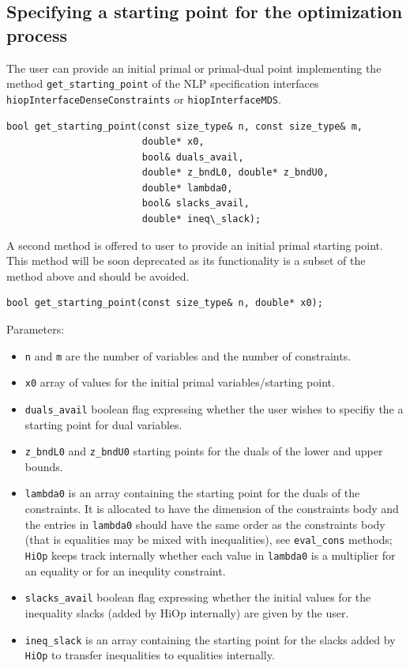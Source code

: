 \documentclass[11pt]{article}
\newcommand{\Hi}{\texttt{HiOp}\xspace}
\begin{document}
\subsection{Specifying a starting point for the optimization process}

The user  can  provide an initial primal or primal-dual point implementing the method \texttt{get\_starting\_point} of the NLP specification interfaces \texttt{hiopInterfaceDenseConstraints} or \texttt{hiopInterfaceMDS}. 

\begin{lstlisting} 
bool get_starting_point(const size_type& n, const size_type& m,
                        double* x0,
                        bool& duals_avail,
                        double* z_bndL0, double* z_bndU0,
                        double* lambda0,
                        bool& slacks_avail,
                        double* ineq\_slack);
\end{lstlisting} 

A second method is offered to user to provide an initial primal starting point. This method will be soon deprecated as its functionality is a subset of the method above and should be avoided.

\begin{lstlisting} 
bool get_starting_point(const size_type& n, double* x0);
\end{lstlisting} 

Parameters:
\begin{itemize}
\item \texttt{n} and \texttt{m} are the number of variables and the number of constraints.
\item \texttt{x0} array of values for the initial primal variables/starting point.
\item \texttt{duals\_avail} boolean flag expressing whether the user wishes to specifiy the a starting point for dual variables.
\item \texttt{z\_bndL0} and  \texttt{z\_bndU0} starting points for the duals of the lower and upper bounds.
\item \texttt{lambda0} is an array containing the starting point for the duals of the constraints. It is allocated to have the dimension of the constraints body and the entries in \texttt{lambda0} should have the same order as the constraints body (that is equalities may be mixed with inequalities), see \texttt{eval\_cons} methods; \Hi keeps track internally whether each value in \texttt{lambda0} is a multiplier for an equality or for an inequlity constraint.
\item \texttt{slacks\_avail} boolean flag expressing whether the initial values for the inequality slacks (added by HiOp internally) are given by the user.
\item \texttt{ineq\_slack} is an array containing the starting point for the slacks added by \Hi to transfer inequalities to equalities internally.
\end{itemize}
  
\end{document}
